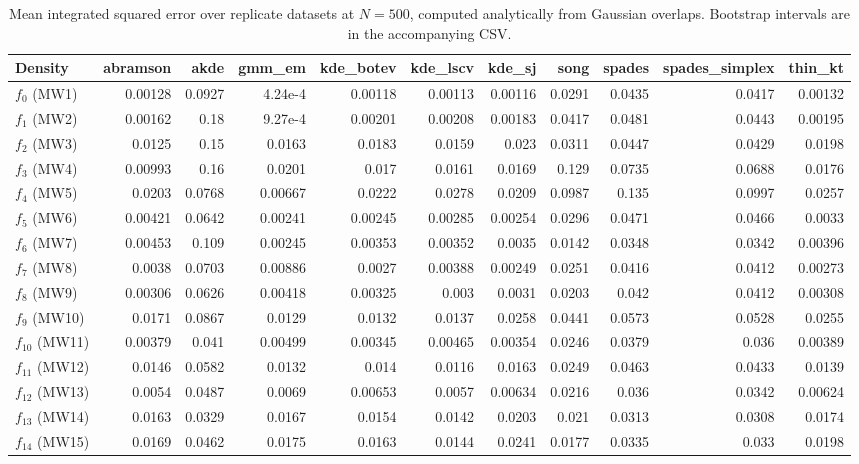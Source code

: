 \begin{table}[htbp]
\centering
\caption{Mean integrated squared error over replicate datasets at $N=500$, computed analytically from Gaussian overlaps. Bootstrap intervals are in the accompanying CSV.}
\label{tab:ise-N500}
\begin{tabular}{lrrrrrrrrrr}
\toprule
Density & abramson & akde & gmm\_em & kde\_botev & kde\_lscv & kde\_sj & song & spades & spades\_simplex & thin\_kt \\
\midrule
$f_{0}$ (MW1) & 0.00128 & 0.0927 & 4.24e-4 & 0.00118 & 0.00113 & 0.00116 & 0.0291 & 0.0435 & 0.0417 & 0.00132 \\
$f_{1}$ (MW2) & 0.00162 & 0.18 & 9.27e-4 & 0.00201 & 0.00208 & 0.00183 & 0.0417 & 0.0481 & 0.0443 & 0.00195 \\
$f_{2}$ (MW3) & 0.0125 & 0.15 & 0.0163 & 0.0183 & 0.0159 & 0.023 & 0.0311 & 0.0447 & 0.0429 & 0.0198 \\
$f_{3}$ (MW4) & 0.00993 & 0.16 & 0.0201 & 0.017 & 0.0161 & 0.0169 & 0.129 & 0.0735 & 0.0688 & 0.0176 \\
$f_{4}$ (MW5) & 0.0203 & 0.0768 & 0.00667 & 0.0222 & 0.0278 & 0.0209 & 0.0987 & 0.135 & 0.0997 & 0.0257 \\
$f_{5}$ (MW6) & 0.00421 & 0.0642 & 0.00241 & 0.00245 & 0.00285 & 0.00254 & 0.0296 & 0.0471 & 0.0466 & 0.0033 \\
$f_{6}$ (MW7) & 0.00453 & 0.109 & 0.00245 & 0.00353 & 0.00352 & 0.0035 & 0.0142 & 0.0348 & 0.0342 & 0.00396 \\
$f_{7}$ (MW8) & 0.0038 & 0.0703 & 0.00886 & 0.0027 & 0.00388 & 0.00249 & 0.0251 & 0.0416 & 0.0412 & 0.00273 \\
$f_{8}$ (MW9) & 0.00306 & 0.0626 & 0.00418 & 0.00325 & 0.003 & 0.0031 & 0.0203 & 0.042 & 0.0412 & 0.00308 \\
$f_{9}$ (MW10) & 0.0171 & 0.0867 & 0.0129 & 0.0132 & 0.0137 & 0.0258 & 0.0441 & 0.0573 & 0.0528 & 0.0255 \\
$f_{10}$ (MW11) & 0.00379 & 0.041 & 0.00499 & 0.00345 & 0.00465 & 0.00354 & 0.0246 & 0.0379 & 0.036 & 0.00389 \\
$f_{11}$ (MW12) & 0.0146 & 0.0582 & 0.0132 & 0.014 & 0.0116 & 0.0163 & 0.0249 & 0.0463 & 0.0433 & 0.0139 \\
$f_{12}$ (MW13) & 0.0054 & 0.0487 & 0.0069 & 0.00653 & 0.0057 & 0.00634 & 0.0216 & 0.036 & 0.0342 & 0.00624 \\
$f_{13}$ (MW14) & 0.0163 & 0.0329 & 0.0167 & 0.0154 & 0.0142 & 0.0203 & 0.021 & 0.0313 & 0.0308 & 0.0174 \\
$f_{14}$ (MW15) & 0.0169 & 0.0462 & 0.0175 & 0.0163 & 0.0144 & 0.0241 & 0.0177 & 0.0335 & 0.033 & 0.0198 \\
\bottomrule
\end{tabular}
\end{table}